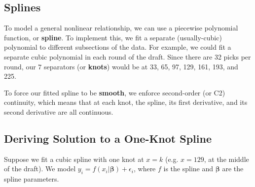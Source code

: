 \documentclass[twoside]{article}
\theoremstyle{definition}
\begin{document}
\subsection{Splines}

To model a general nonlinear relationship, we can use a piecewise polynomial function, or \textbf{spline}. To implement this, we fit a separate (usually-cubic) polynomial to different subsections of the data. For example, we could fit a separate cubic polynomial in each round of the draft. Since there are 32 picks per round, our $7$ separators (or \textbf{knots}) would be at 33, 65, 97, 129, 161, 193, and 225.

To force our fitted spline to be \textbf{smooth}, we enforce second-order (or C2) continuity, which means that at each knot, the spline, its first derivative, and its second derivative are all continuous.

\subsection{Deriving Solution to a One-Knot Spline}

Suppose we fit a cubic spline with one knot at $x = k$ (e.g. $x = 129$, at the middle of the draft). We model $y_i = f(x_i | \boldsymbol{\beta}) + \epsilon_i$, where $f$ is the spline and $\boldsymbol{\beta}$ are the spline parameters.
\end{document}
